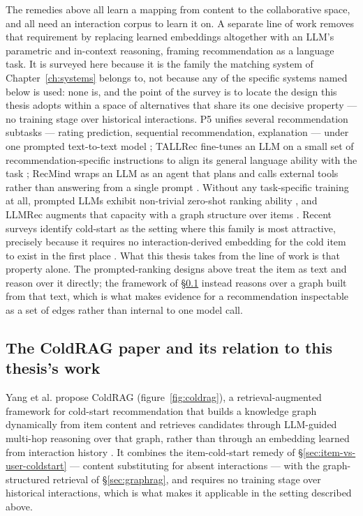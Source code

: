 The remedies above all learn a mapping from content to the collaborative space, and all need an interaction corpus to learn it on. A separate line of work removes that requirement by replacing learned embeddings altogether with an LLM's parametric and in-context reasoning, framing recommendation as a language task. It is surveyed here because it is the family the matching system of Chapter~\ref{ch:systems} belongs to, not because any of the specific systems named below is used: none is, and the point of the survey is to locate the design this thesis adopts within a space of alternatives that share its one decisive property --- no training stage over historical interactions. P5 unifies several recommendation subtasks — rating prediction, sequential recommendation, explanation — under one prompted text-to-text model \citep{geng2022recommendation}; TALLRec fine-tunes an LLM on a small set of recommendation-specific instructions to align its general language ability with the task \citep{bao2023tallrec}; RecMind wraps an LLM as an agent that plans and calls external tools rather than answering from a single prompt \citep{wang2024recmind}. Without any task-specific training at all, prompted LLMs exhibit non-trivial zero-shot ranking ability \citep{dai2023uncovering,hou2024large}, and LLMRec augments that capacity with a graph structure over items \citep{wei2024llmrec}. Recent surveys identify cold-start as the setting where this family is most attractive, precisely because it requires no interaction-derived embedding for the cold item to exist in the first place \citep{zhang2025cold,wu2024survey,lin2025how}. What this thesis takes from the line of work is that property alone. The prompted-ranking designs above treat the item as text and reason over it directly; the framework of \S\ref{sec:coldrag-paper} instead reasons over a graph built from that text, which is what makes evidence for a recommendation inspectable as a set of edges rather than internal to one model call.

\subsection{The ColdRAG paper and its relation to this thesis's work}
\label{sec:coldrag-paper}

Yang et al. propose ColdRAG (figure~\ref{fig:coldrag}), a retrieval-augmented framework for cold-start recommendation that builds a knowledge graph dynamically from item content and retrieves candidates through LLM-guided multi-hop reasoning over that graph, rather than through an embedding learned from interaction history \citep{yang2025adaptive}. It combines the item-cold-start remedy of \S\ref{sec:item-vs-user-coldstart} — content substituting for absent interactions — with the graph-structured retrieval of \S\ref{sec:graphrag}, and requires no training stage over historical interactions, which is what makes it applicable in the setting described above.

